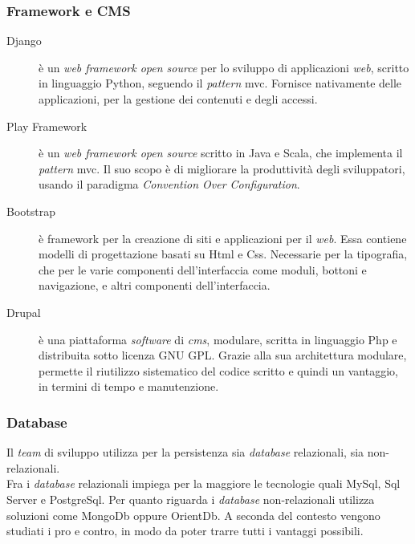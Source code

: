 \subsubsection{Framework e CMS}
\begin{description}
\item[Django] è un \emph{web \gls{framework} open source} per lo sviluppo di applicazioni \emph{web}, scritto in linguaggio Python, seguendo il \emph{pattern} \gls{mvc}. Fornisce nativamente delle applicazioni, per la gestione dei contenuti e degli accessi.
\item[Play Framework] è un \emph{web \gls{framework} open source} scritto in Java e Scala, che implementa il \emph{pattern} \gls{mvc}. Il suo scopo è di migliorare la produttività degli sviluppatori, usando il paradigma \emph{Convention Over Configuration}.\newpage
\item[Bootstrap] è \gls{framework} per la creazione di siti e applicazioni per il \emph{web}. Essa contiene modelli di progettazione basati su Html e Css. Necessarie per la tipografia, che per le varie componenti dell'interfaccia come moduli, bottoni e navigazione, e altri componenti dell'interfaccia.
\item[Drupal] è una piattaforma \emph{software} di \emph{\gls{cms}}, modulare, scritta in linguaggio Php e distribuita sotto licenza GNU GPL. Grazie alla sua architettura modulare, permette il riutilizzo sistematico del codice scritto e quindi un vantaggio, in termini di tempo e manutenzione.
\end{description}

\subsubsection{Database}
Il \emph{team} di sviluppo utilizza per la persistenza sia \emph{database} relazionali, sia non-relazionali.\\Fra i \emph{database} relazionali impiega per la maggiore le tecnologie quali MySql, Sql Server e PostgreSql. Per quanto riguarda i \emph{database} non-relazionali utilizza soluzioni come MongoDb oppure OrientDb. A seconda del contesto vengono studiati i pro e contro, in modo da poter trarre tutti i vantaggi possibili.




\newpage
